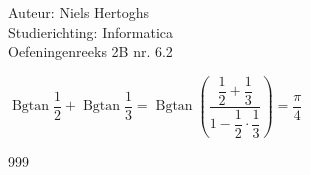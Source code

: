 \documentclass[a4paper]{article}
\begin{document}
  
\noindent \large Auteur: Niels Hertoghs \\
\noindent \large Studierichting: Informatica\\
\noindent \large Oefeningenreeks 2B nr. 6.2\\

\medskip

\normalsize

$\operatorname{Bgtan}\dfrac{1}{2} + \operatorname{Bgtan}\dfrac{1}{3} = \operatorname{Bgtan}\left(\dfrac{\dfrac{1}{2}+\dfrac{1}{3}}{1-\dfrac{1}{2}\cdot\dfrac{1}{3}}\right) = \dfrac{\pi}{4}$\\


\begin{thebibliography}{999}	 
\end{thebibliography}
\end{document}
